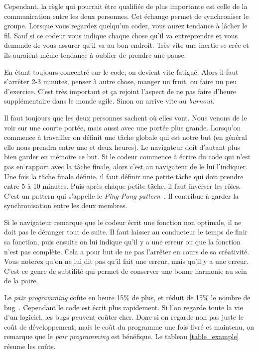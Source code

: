 \documentclass[journal, a4paper, frenchb]{IEEEtran}
\begin{document}
Cependant, la règle qui pourrait être qualifiée de plus importante est celle de la communication entre les deux personnes. Cet échange permet de synchroniser le groupe. Lorsque vous regardez quelqu’un coder, vous aurez tendance à lâcher le fil. Sauf si ce codeur vous indique chaque chose qu’il va entreprendre et vous demande de vous assurer qu’il va au bon endroit. Très vite une inertie se crée et ils auraient même tendance à oublier de prendre une pause.

En étant toujours concentré sur le code, on devient vite fatigué. Alors il faut s’arrêter 2-3 minutes, penser à autre chose, manger un fruit, ou faire un peu d’exercice. C’est très important et ça rejoint l’aspect de ne pas faire d’heure supplémentaire dans le monde agile. Sinon on arrive vite au \emph{burnout}.

Il faut toujours que les deux personnes sachent où elles vont. Nous venons de le voir sur une courte portée, mais aussi avec une portée plus grande. Lorsqu’on commence à travailler on définit une tâche globale qui est notre but (en général elle nous prendra entre une et deux heures). Le navigateur doit d’autant plus bien garder en mémoire ce but. Si le codeur commence à écrire du code qui n’est pas en rapport avec la tâche finale, alors c’est au navigateur de le lui l’indiquer. Une fois la tâche finale définie, il faut définir une petite tâche qui doit prendre entre 5 à 10 minutes. Puis après chaque petite tâche, il faut inverser les rôles. C'est un pattern qui s'appelle le \emph{Ping Pong pattern}~\cite{PPping}. Il contribue à garder la synchronisation entre les deux membres.

Si le navigateur remarque que le codeur écrit une fonction non optimale, il ne doit pas le déranger tout de suite. Il faut laisser au conducteur le temps de finir sa fonction, puis ensuite on lui indique qu’il y a une erreur ou que la fonction n’est pas complète. Cela a pour but de ne pas l'arrêter en cours de sa créativité. Vous noterez qu'on ne lui dit pas qu'il fait une erreur, mais qu'il y a une erreur. C'est ce genre de subtilité qui permet de conserver une bonne harmonie au sein de la paire.

Le \emph{pair programming} coûte en heure 15\% de plus, et réduit de 15\% le nombre de bug~\cite[p.~86]{PPLaurie}. Cependant le code est écrit plus rapidement. Si l'on regarde toute la vie d'un logiciel, les bugs peuvent coûter cher. Donc si on regarde non pas juste le coût de développement, mais le coût du programme une fois livré et maintenu, on remarque que le \emph{pair programming} est bénéfique. Le tableau \ref{table_example} résume les coûts.
\end{document}
